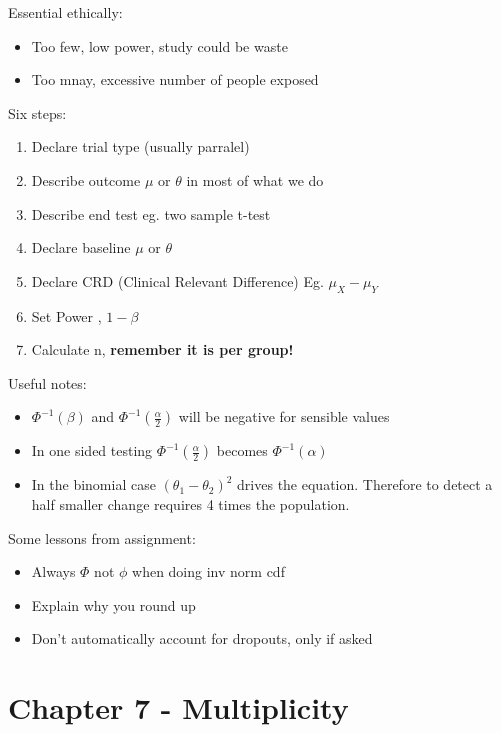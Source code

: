 \documentclass[
  letterpaper,
  DIV=11,
  numbers=noendperiod]{scrreprt}
\providecommand{\tightlist}{%
  \setlength{\itemsep}{0pt}\setlength{\parskip}{0pt}}\usepackage{longtable,booktabs,array}
\begin{document}
Essential ethically:

\begin{itemize}
\tightlist
\item
  Too few, low power, study could be waste
\item
  Too mnay, excessive number of people exposed
\end{itemize}

Six steps:

\begin{enumerate}
\def\labelenumi{\arabic{enumi})}
\tightlist
\item
  Declare trial type (usually parralel)
\item
  Describe outcome \(\mu\) or \(\theta\) in most of what we do
\item
  Describe end test eg. two sample t-test
\item
  Declare baseline \(\mu\) or \(\theta\)
\item
  Declare CRD (Clinical Relevant Difference) Eg. \(\mu_X - \mu_Y\)
\item
  Set Power , \(1- \beta\)
\item
  Calculate n, \textbf{remember it is per group!}
\end{enumerate}

Useful notes:

\begin{itemize}
\tightlist
\item
  \(\Phi^{-1}(\beta)\) and \(\Phi^{-1}(\frac{\alpha}{2})\) will be
  negative for sensible values
\item
  In one sided testing \(\Phi^{-1}(\frac{\alpha}{2})\) becomes
  \(\Phi^{-1}(\alpha)\)
\item
  In the binomial case \((\theta_1 - \theta_2)^2\) drives the equation.
  Therefore to detect a half smaller change requires 4 times the
  population.
\end{itemize}

Some lessons from assignment:

\begin{itemize}
\tightlist
\item
  Always \(\Phi\) not \(\phi\) when doing inv norm cdf
\item
  Explain why you round up
\item
  Don't automatically account for dropouts, only if asked
\end{itemize}


\hypertarget{chapter-7---multiplicity}{%
\chapter{Chapter 7 - Multiplicity}\label{chapter-7---multiplicity}}
\end{document}
